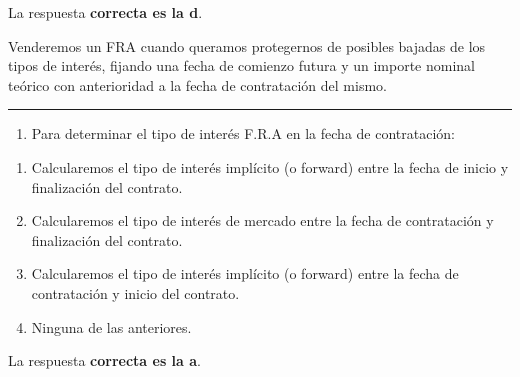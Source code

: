 \documentclass[
  letterpaper,
  DIV=11,
  numbers=noendperiod]{scrreprt}
\providecommand{\tightlist}{%
  \setlength{\itemsep}{0pt}\setlength{\parskip}{0pt}}\usepackage{longtable,booktabs,array}
\begin{document}
\begin{tcolorbox}[enhanced jigsaw, left=2mm, opacityback=0, colback=white, breakable, arc=.35mm, bottomrule=.15mm, rightrule=.15mm, toprule=.15mm, leftrule=.75mm, colframe=quarto-callout-tip-color-frame]
\begin{minipage}[t]{5.5mm}
\textcolor{quarto-callout-tip-color}{\faLightbulb}
\end{minipage}%
\begin{minipage}[t]{\textwidth - 5.5mm}

La respuesta \textbf{correcta es la d}.

Venderemos un FRA cuando queramos protegernos de posibles bajadas de los
tipos de interés, fijando una fecha de comienzo futura y un importe
nominal teórico con anterioridad a la fecha de contratación del mismo.

\end{minipage}%
\end{tcolorbox}

\begin{center}\rule{0.5\linewidth}{0.5pt}\end{center}

\begin{enumerate}
\def\labelenumi{\arabic{enumi}.}
\setcounter{enumi}{47}
\tightlist
\item
  Para determinar el tipo de interés F.R.A en la fecha de contratación:
\end{enumerate}

\begin{enumerate}
\def\labelenumi{\alph{enumi}.}
\item
  Calcularemos el tipo de interés implícito (o forward) entre la fecha
  de inicio y finalización del contrato.
\item
  Calcularemos el tipo de interés de mercado entre la fecha de
  contratación y finalización del contrato.
\item
  Calcularemos el tipo de interés implícito (o forward) entre la fecha
  de contratación y inicio del contrato.
\item
  Ninguna de las anteriores.
\end{enumerate}

\begin{tcolorbox}[enhanced jigsaw, left=2mm, opacityback=0, colback=white, breakable, arc=.35mm, bottomrule=.15mm, rightrule=.15mm, toprule=.15mm, leftrule=.75mm, colframe=quarto-callout-tip-color-frame]
\begin{minipage}[t]{5.5mm}
\textcolor{quarto-callout-tip-color}{\faLightbulb}
\end{minipage}%
\begin{minipage}[t]{\textwidth - 5.5mm}

La respuesta \textbf{correcta es la a}.

\end{minipage}%
\end{tcolorbox}
\end{document}
